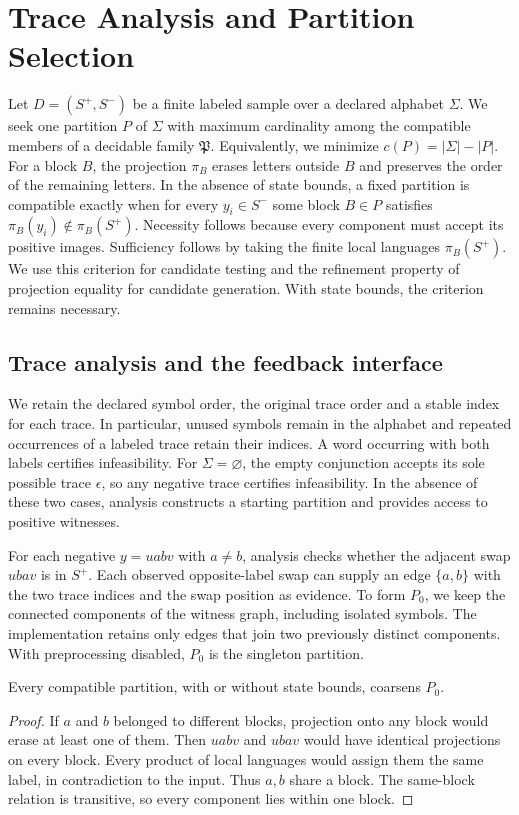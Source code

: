 \section{Trace Analysis and Partition Selection}
\label{sec:guided-selection}

Let \(D=(S^+,S^-)\) be a finite labeled sample over a declared alphabet
\(\Sigma\). We seek one partition \(P\) of \(\Sigma\) with maximum
cardinality among the compatible members of a decidable family
\(\mathfrak P\). Equivalently, we minimize
\(c(P)=|\Sigma|-|P|\).
For a block \(B\), the projection \(\pi_B\) erases letters outside \(B\)
and preserves the order of the remaining letters.
In the absence of state bounds, a fixed partition is compatible exactly
when for every \(y_i\in S^-\) some block \(B\in P\) satisfies
\(\pi_B(y_i)\notin\pi_B(S^+)\). Necessity follows because every component
must accept its positive images. Sufficiency follows by taking the finite
local languages \(\pi_B(S^+)\). We use this criterion for candidate
testing and the refinement property of projection equality for
candidate generation. With state bounds, the criterion remains necessary.

\subsection{Trace analysis and the feedback interface}

We retain the declared symbol order, the original trace order and a
stable index for each trace. In particular, unused symbols remain in the
alphabet and repeated occurrences of a labeled trace retain their
indices. A word occurring with both labels certifies infeasibility.
For \(\Sigma=\varnothing\), the empty conjunction accepts its sole
possible trace \(\epsilon\), so any negative trace certifies
infeasibility. In the absence of these two cases, analysis constructs
a starting partition and provides access to positive witnesses.

For each negative \(y=uabv\) with \(a\ne b\), analysis checks whether
the adjacent swap \(ubav\) is in \(S^+\). Each observed opposite-label
swap can supply an edge \(\{a,b\}\) with the two trace indices and the
swap position as evidence. To form \(P_0\), we keep the connected
components of the witness graph, including isolated symbols. The
implementation retains only edges that join two previously distinct
components. With preprocessing disabled, \(P_0\) is the singleton
partition.

\begin{lemma}
Every compatible partition, with or without state bounds, coarsens \(P_0\).
\end{lemma}
\begin{proof}
If \(a\) and \(b\) belonged to different blocks, projection onto any
block would erase at least one of them. Then \(uabv\) and \(ubav\)
would have identical projections on every block. Every product of
local languages would assign them the same label, in contradiction to
the input. Thus \(a,b\) share a block. The same-block relation is
transitive, so every component lies within one block.
\end{proof}

